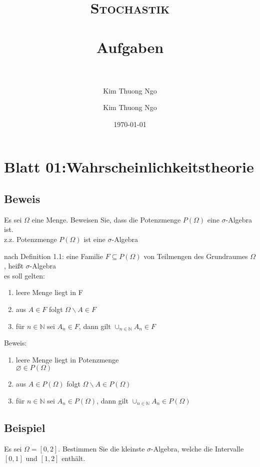 \documentclass[paper=a4, fontsize=11pt]{scrartcl}
\author{Kim Thuong Ngo}
\title{	
\normalfont \normalsize 
\textsc{Stochastik} \\ [25pt] 
\horrule{0.5pt} \\[0.4cm] 
\huge Aufgaben \\ 
\horrule{2pt} \\[0.5cm] 
}
\author{Kim Thuong Ngo}
\date{\normalsize\today}
\numberwithin{equation}{section}
\numberwithin{figure}{section}
\numberwithin{table}{section}
\begin{document}
\maketitle 

\newpage

\tableofcontents

\newpage

\section{Blatt 01:Wahrscheinlichkeitstheorie}
\subsection{Beweis}
Es sei $\Omega$ eine Menge. Beweisen Sie, dass die Potenzmenge $P( \Omega)$ eine $ \sigma$-Algebra ist. \\

z.z. Potenzmenge $P( \Omega)$ ist eine $ \sigma$-Algebra

nach Definition 1.1:
eine Familie $F \subseteq P( \Omega)$ von Teilmengen des Grundraumes $ \Omega$, heißt $ \sigma$-Algebra \\
es soll gelten: 
\begin{enumerate}
\item leere Menge liegt in F
\item aus $A \in F$ folgt $ \Omega \backslash A \in F$
\item für $n \in \mathbb{N}$ sei $A_{n} \in F$, dann gilt $\cup_{n \in \mathbb{N}} A_{n} \in F$
\end{enumerate}

Beweis:
\begin{enumerate}
\item leere Menge liegt in Potenzmenge \\
$\varnothing \in P( \Omega)$
\item aus $A \in P( \Omega)$ folgt $ \Omega \backslash A \in P( \Omega)$
\item für $n \in \mathbb{N}$ sei $A_{n} \in P( \Omega)$, dann gilt $\cup_{n \in \mathbb{N}} A_{n} \in P( \Omega)$
\end{enumerate}

\subsection{Beispiel}
Es sei $ \Omega = [0,2]$. Bestimmen Sie die kleinste $ \sigma$-Algebra, welche die Intervalle $[0,1]$ und $[1,2]$ enthält. \\
\end{document}
